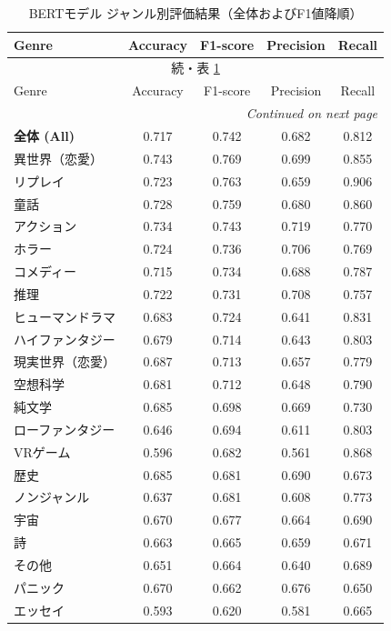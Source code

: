 \documentclass[uplatex, dvipdfmx, 11pt, a4paper, report]{jsbook}
\begin{document}
\begin{longtable}{lcccc}
\caption{BERTモデル ジャンル別評価結果（全体およびF1値降順）} \label{tab:bert_all_score} \\
\hline
Genre & Accuracy & F1-score & Precision & Recall \\ \hline
\endfirsthead

\multicolumn{5}{c}{{続・表 \ref{tab:bert_all_score}}} \\
\hline
Genre & Accuracy & F1-score & Precision & Recall \\ \hline
\endhead

\hline \multicolumn{5}{r}{\textit{Continued on next page}} \\
\endfoot

\hline
\endlastfoot

\textbf{全体 (All)} & 0.717 & 0.742 & 0.682 & 0.812 \\ \hline
異世界（恋愛） & 0.743 & 0.769 & 0.699 & 0.855 \\
リプレイ & 0.723 & 0.763 & 0.659 & 0.906 \\
童話 & 0.728 & 0.759 & 0.680 & 0.860 \\
アクション & 0.734 & 0.743 & 0.719 & 0.770 \\
ホラー & 0.724 & 0.736 & 0.706 & 0.769 \\
コメディー & 0.715 & 0.734 & 0.688 & 0.787 \\
推理 & 0.722 & 0.731 & 0.708 & 0.757 \\
ヒューマンドラマ & 0.683 & 0.724 & 0.641 & 0.831 \\
ハイファンタジー & 0.679 & 0.714 & 0.643 & 0.803 \\
現実世界（恋愛） & 0.687 & 0.713 & 0.657 & 0.779 \\
空想科学 & 0.681 & 0.712 & 0.648 & 0.790 \\
純文学 & 0.685 & 0.698 & 0.669 & 0.730 \\
ローファンタジー & 0.646 & 0.694 & 0.611 & 0.803 \\
VRゲーム & 0.596 & 0.682 & 0.561 & 0.868 \\
歴史 & 0.685 & 0.681 & 0.690 & 0.673 \\
ノンジャンル & 0.637 & 0.681 & 0.608 & 0.773 \\
宇宙 & 0.670 & 0.677 & 0.664 & 0.690 \\
詩 & 0.663 & 0.665 & 0.659 & 0.671 \\
その他 & 0.651 & 0.664 & 0.640 & 0.689 \\
パニック & 0.670 & 0.662 & 0.676 & 0.650 \\
エッセイ & 0.593 & 0.620 & 0.581 & 0.665 \\
\end{longtable}
\end{document}
